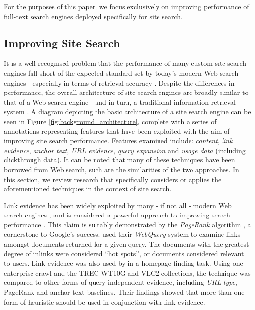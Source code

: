 For the purposes of this paper, we focus exclusively on improving performance of full-text search engines deployed specifically for site search.

\subsection{Improving Site Search}
It is a well recognised problem that the performance of many custom site search engines fall short of the expected standard set by today's modern Web search engines - especially in terms of retrieval accuracy \cite{ding2007log_based_site_search}. Despite the differences in performance, the overall architecture of site search engines are broadly similar to that of a Web search engine - and in turn, a traditional information retrieval system \cite{croft2009search_engine_book}. A diagram depicting the basic architecture of a site search engine can be seen in Figure \ref{fig:background_architecture}, complete with a series of annotations representing features that have been exploited with the aim of improving site search performance. Features examined include: \emph{content}, \emph{link evidence}, \emph{anchor text}, \emph{URL evidence}, \emph{query expansion} and \emph{usage data} (including clickthrough data). It can be noted that many of these techniques have been borrowed from Web search, such are the similarities of the two approaches. In this section, we review research that specifically considers or applies the aforementioned techniques in the context of site search.

Link evidence has been widely exploited by many - if not all - modern Web search engines \cite{upstill2003queryindependent_evidence}, and is considered a powerful approach to improving search performance \cite{carriere1997webquery}. This claim is suitably demonstrated by the \emph{PageRank} algorithm \cite{page1999pagerank}, a cornerstone to Google's success. \citeauthor{carriere1997webquery} \cite{carriere1997webquery} used their \emph{WebQuery} system to examine links amongst documents returned for a given query. The documents with the greatest degree of inlinks were considered ``hot spots'', or documents considered relevant to users. Link evidence was also used by \citeauthor{upstill2003queryindependent_evidence} \cite{upstill2003queryindependent_evidence} in a homepage finding task. Using one enterprise crawl and the TREC WT10G and VLC2 collections, the technique was compared to other forms of query-independent evidence, including \emph{URL-type}, PageRank and anchor text baselines. Their findings showed that more than one form of heuristic should be used in conjunction with link evidence. 

